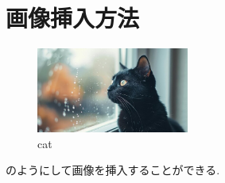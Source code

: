 \documentclass[../master/master.tex]{subfiles}
\begin{document}
    \section{画像挿入方法}

        \begin{figure}[h]
            \centering
            \includegraphics[width=50mm]{../../imgs/sub1/cat.jpg}
            \caption{cat}
        \end{figure}

        のようにして画像を挿入することができる.
\end{document}
